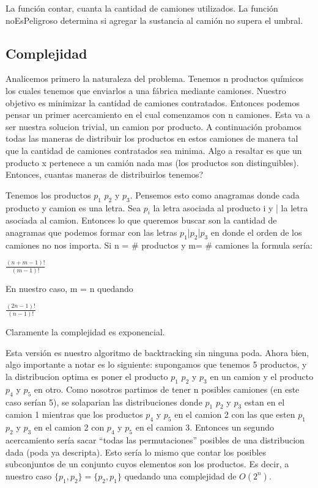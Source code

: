 La función contar, cuanta la cantidad de camiones utilizados. 
La función noEsPeligroso determina si agregar la sustancia al camión no supera el umbral.


\subsection{Complejidad}
Analicemos primero la naturaleza del problema. Tenemos n productos químicos los cuales tenemos que enviarlos a una fábrica mediante camiones. Nuestro objetivo es minimizar la cantidad de camiones contratados. Entonces podemos pensar un primer acercamiento en el cual comenzamos con n camiones. Esta va a ser nuestra solucion trivial, un camion por producto. A continuación probamos todas las maneras de distribuir los productos en estos camiones de manera tal que la cantidad de camiones contratados sea minima. Algo a resaltar es que un producto x pertenece a un camión nada mas (los productos son distinguibles). Entonces, cuantas maneras de distribuirlos tenemos?

Tenemos los productos $p_{1}$ $p_{2}$ y $p_{3}$. Pensemos esto como anagramas donde cada producto y camion es una letra. Sea $p_{i}$ la letra asociada al producto i y | la letra asociada al camion. Entonces lo que queremos buscar son la cantidad de anagramas que podemos formar con las letras $p_{1}$|$p_{2}$|$p_{3}$ en donde el orden de los camiones no nos importa. Si n = \# productos y m= \# camiones la formula sería:

$\frac{(n+m-1)!}{(m-1)!}$

En nuestro caso, m = n quedando

$\frac{(2n-1)!}{(n-1)!}$

Claramente la complejidad es exponencial.

Esta versión es nuestro algoritmo de backtracking sin ninguna poda. Ahora bien, algo importante a notar es lo siguiente: supongamos que tenemos 5 productos, y la distribucion optima es poner el producto $p_{1}$ $p_{2}$ y $p_{3}$ en un camion y el producto $p_{4}$ y $p_{5}$ en otro. Como nosotros partimos de tener n posibles camiones (en este caso serían 5), se solaparian las distribuciones donde $p_{1}$ $p_{2}$ y $p_{3}$ estan en el camion 1 mientras que los productos $p_{4}$ y $p_{5}$ en el camion 2 con las que esten $p_{1}$ $p_{2}$ y $p_{3}$ en el camion 2 con $p_{4}$ y $p_{5}$ en el camion 3. Entonces un segundo acercamiento sería sacar "`todas las permutaciones"' posibles de una distribucion dada (poda ya descripta). Esto sería lo mismo que contar los posibles subconjuntos de un conjunto cuyos elementos son los productos. Es decir, a nuestro caso $\{p_{1}, p_{2}\} = \{p_{2}, p_{1}\}$ quedando una complejidad de $O(2^n)$.

